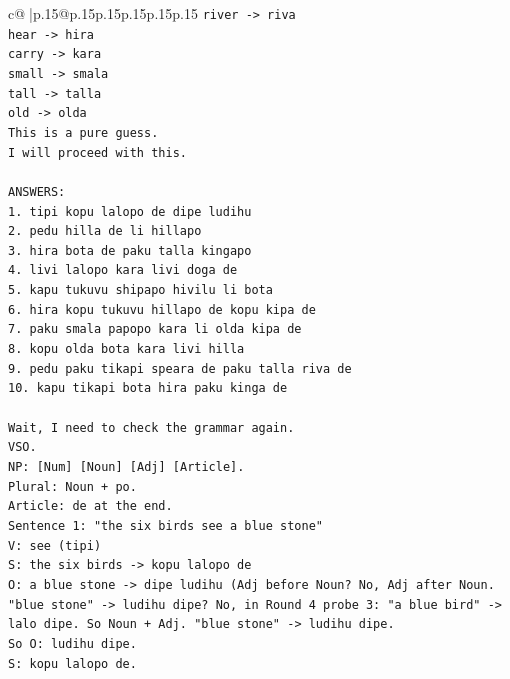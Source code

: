 \documentclass{article}
\begin{document}
{\begin{supertabular}{c@{$\;$}|p{.15\linewidth}@{}p{.15\linewidth}p{.15\linewidth}p{.15\linewidth}p{.15\linewidth}p{.15\linewidth}}
{{{\texttt{river {-}> riva} \\
\texttt{hear {-}> hira} \\
\texttt{carry {-}> kara} \\
\texttt{small {-}> smala} \\
\texttt{tall {-}> talla} \\
\texttt{old {-}> olda} \\
\texttt{This is a pure guess.} \\
\texttt{I will proceed with this.} \\
\\ 
\texttt{ANSWERS:} \\
\texttt{1. tipi kopu lalopo de dipe ludihu} \\
\texttt{2. pedu hilla de li hillapo} \\
\texttt{3. hira bota de paku talla kingapo} \\
\texttt{4. livi lalopo kara livi doga de} \\
\texttt{5. kapu tukuvu shipapo hivilu li bota} \\
\texttt{6. hira kopu tukuvu hillapo de kopu kipa de} \\
\texttt{7. paku smala papopo kara li olda kipa de} \\
\texttt{8. kopu olda bota kara livi hilla} \\
\texttt{9. pedu paku tikapi speara de paku talla riva de} \\
\texttt{10. kapu tikapi bota hira paku kinga de} \\
\\ 
\texttt{Wait, I need to check the grammar again.} \\
\texttt{VSO.} \\
\texttt{NP: {[}Num{]} {[}Noun{]} {[}Adj{]} {[}Article{]}.} \\
\texttt{Plural: Noun + po.} \\
\texttt{Article: de at the end.} \\
\texttt{Sentence 1: "the six birds see a blue stone"} \\
\texttt{V: see (tipi)} \\
\texttt{S: the six birds {-}> kopu lalopo de} \\
\texttt{O: a blue stone {-}> dipe ludihu (Adj before Noun? No, Adj after Noun. "blue stone" {-}> ludihu dipe? No, in Round 4 probe 3: "a blue bird" {-}> lalo dipe. So Noun + Adj. "blue stone" {-}> ludihu dipe.} \\
\texttt{So O: ludihu dipe.} \\
\texttt{S: kopu lalopo de.} \\
}}}
\end{supertabular}}
\end{document}
